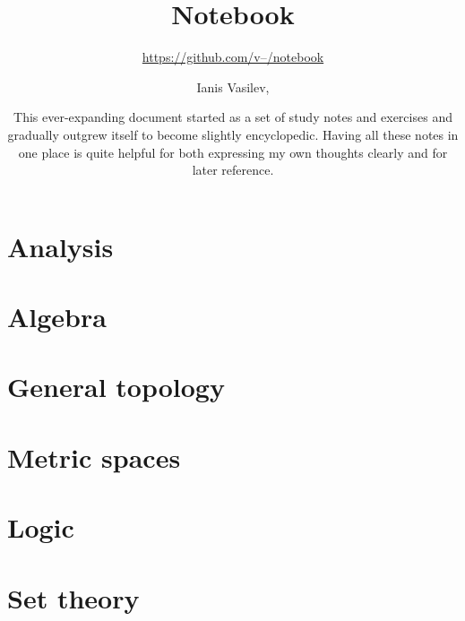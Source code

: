 \documentclass[numbers=endperiod, bibliography=totocnumbered, oneside]{scrbook}
\title{Notebook}
\subtitle{\href{https://github.com/v--/notebook}{https://github.com/v--/notebook}}
\author{Ianis Vasilev, \Email{ianis@ivasilev.net}}
\date{\justify
  This ever-expanding document started as a set of study notes and exercises and gradually outgrew itself to become slightly encyclopedic. Having all these notes in one place is quite helpful for both expressing my own thoughts clearly and for later reference.
}
\begin{document}
\hfuzz=2pt
\maketitle
\tableofcontents

\chapter{Analysis}\label{ch:analysis}










\chapter{Algebra}\label{ch:algebra}






\chapter{General topology}\label{ch:general_topology}








\chapter{Metric spaces}\label{ch:metric_spaces}





\chapter{Logic}\label{ch:logic}




\chapter{Set theory}\label{ch:set_theory}




\end{document}
